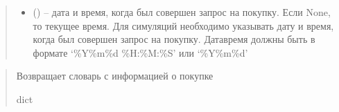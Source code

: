 \documentclass[letterpaper,10pt,english,openany,oneside]{sphinxmanual}
\begin{document}
\begin{fulllineitems}
\begin{fulllineitems}
\begin{quote}
\begin{description}
\begin{itemize}
\item {} 
\sphinxAtStartPar
{} (\sphinxstyleliteralemphasis{\sphinxupquote{{[}}}\sphinxstyleliteralemphasis{\sphinxupquote{{]}}}) – дата и время, когда был совершен запрос на покупку. Если None, то текущее время.
Для симуляций необходимо указывать дату и время, когда был совершен запрос на покупку.
Дата\sphinxhyphen{}время должны быть в формате ‘\%Y\sphinxhyphen{}\%m\sphinxhyphen{}\%d \%H:\%M:\%S’ или ‘\%Y\sphinxhyphen{}\%m\sphinxhyphen{}\%d’

\end{itemize}

\end{description}\end{quote}

\end{fulllineitems}


\begin{fulllineitems}
\label{\detokenize{src.structures:src.structures.st_purchase.StockPurchaseRequest.get_state}}
\pysigstartsignatures
{}
\pysigstopsignatures
\begin{sphinxVerbatim}[commandchars=\\\{\}]
   
\end{sphinxVerbatim}
\begin{quote}\begin{description}
\sphinxAtStartPar
Возвращает словарь с информацией о покупке

\sphinxAtStartPar
dict

\end{description}\end{quote}

\end{fulllineitems}


\end{fulllineitems}
\end{document}
